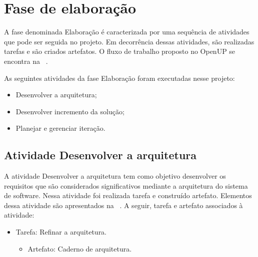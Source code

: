 %

\section{Fase de elaboração}

A fase denominada Elaboração é caracterizada por uma sequência de atividades que pode ser seguida no projeto. Em decorrência dessas atividades, são realizadas tarefas e são criados artefatos. O fluxo de trabalho proposto no OpenUP se encontra na ~.


%

As seguintes atividades da fase Elaboração foram executadas nesse projeto:

\begin{itemize}
    \item Desenvolver a arquitetura;
    \item Desenvolver incremento da solução;
    \item Planejar e gerenciar iteração.
\end{itemize}

\subsection{Atividade Desenvolver a arquitetura}

A atividade Desenvolver a arquitetura tem como objetivo desenvolver os requisitos que são considerados significativos mediante a arquitetura do sistema de software. Nessa atividade foi realizada tarefa e construído artefato. Elementos dessa atividade são apresentados na ~. A seguir, tarefa e artefato associados à atividade:

\begin{itemize}
    \item Tarefa: Refinar a arquitetura.
    \begin{itemize}
        \item Artefato: Caderno de arquitetura.
    \end{itemize}
\end{itemize}

%

